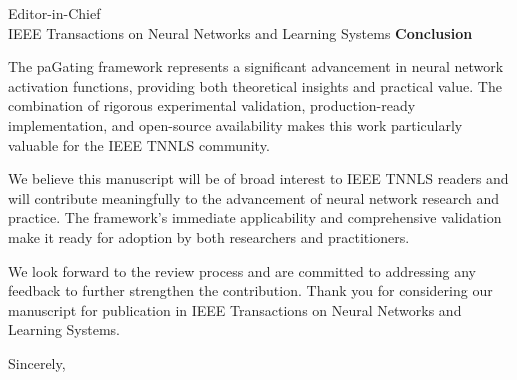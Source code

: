 \documentclass[11pt]{letter}
\begin{document}
\begin{letter}{Editor-in-Chief\\
IEEE Transactions on Neural Networks and Learning Systems}
\textbf{\large Conclusion}

\vspace{0.5em}

The paGating framework represents a significant advancement in neural network activation functions, providing both theoretical insights and practical value. The combination of rigorous experimental validation, production-ready implementation, and open-source availability makes this work particularly valuable for the IEEE TNNLS community.

We believe this manuscript will be of broad interest to IEEE TNNLS readers and will contribute meaningfully to the advancement of neural network research and practice. The framework's immediate applicability and comprehensive validation make it ready for adoption by both researchers and practitioners.

We look forward to the review process and are committed to addressing any feedback to further strengthen the contribution. Thank you for considering our manuscript for publication in IEEE Transactions on Neural Networks and Learning Systems.

\closing{Sincerely,}

\end{letter}
\end{document}
